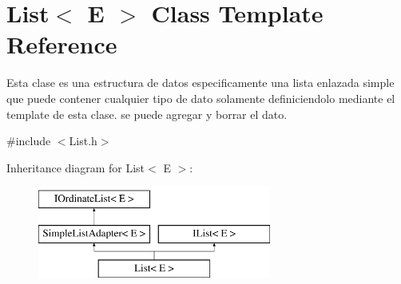 \hypertarget{class_list}{\section{List$<$ E $>$ Class Template Reference}
\label{class_list}
}


Esta clase es una estructura de datos especificamente una lista enlazada simple que puede contener cualquier tipo de dato solamente definiciendolo mediante el template de esta clase. se puede agregar y borrar el dato.  




{\ttfamily \#include $<$List.\-h$>$}

Inheritance diagram for List$<$ E $>$\-:\begin{figure}[H]
\begin{center}
\leavevmode
\includegraphics[height=3.000000cm]{class_list}
\end{center}
\end{figure}
